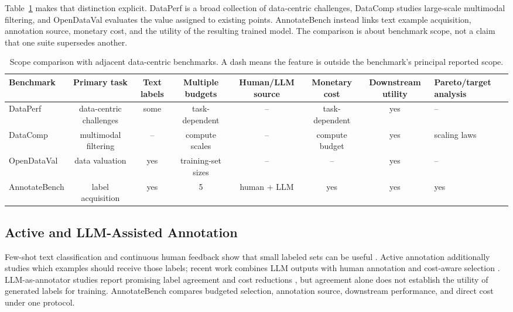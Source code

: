 \documentclass[conference]{IEEEtran}
\begin{document}
Table~\ref{tab:positioning} makes that distinction explicit. DataPerf is a broad collection of data-centric challenges, DataComp studies large-scale multimodal filtering, and OpenDataVal evaluates the value assigned to existing points. AnnotateBench instead links text example acquisition, annotation source, monetary cost, and the utility of the resulting trained model. The comparison is about benchmark scope, not a claim that one suite supersedes another.

\begin{table}[t]
\caption{Scope comparison with adjacent data-centric benchmarks. A dash means the feature is outside the benchmark's principal reported scope.}
\label{tab:positioning}
\centering
\footnotesize
\setlength{\tabcolsep}{2pt}
\begin{tabular}{lccccccl}
\toprule
Benchmark & Primary task & Text labels & Multiple budgets & Human/LLM source & Monetary cost & Downstream utility & Pareto/target analysis \\
\midrule
DataPerf \cite{mazumder2022dataperf} & data-centric challenges & some & task-dependent & -- & task-dependent & yes & -- \\
DataComp \cite{gadre2023datacomp} & multimodal filtering & -- & compute scales & -- & compute budget & yes & scaling laws \\
OpenDataVal \cite{jiang2023opendataval} & data valuation & yes & training-set sizes & -- & -- & yes & -- \\
AnnotateBench & label acquisition & yes & 5 & human + LLM & yes & yes & yes \\
\bottomrule
\end{tabular}
\end{table}

\subsection{Active and LLM-Assisted Annotation}
Few-shot text classification and continuous human feedback show that small labeled sets can be useful \cite{tunstall2022setfit,vidra2024humanfeedback}. Active annotation additionally studies which examples should receive those labels; recent work combines LLM outputs with human annotation and cost-aware selection \cite{rouzegar2024llmdriven}. LLM-as-annotator studies report promising label agreement and cost reductions \cite{wang2021gpt3labeling,gilardi2023chatgpt,pangakis2024distillation}, but agreement alone does not establish the utility of generated labels for training. AnnotateBench compares budgeted selection, annotation source, downstream performance, and direct cost under one protocol.
\end{document}
